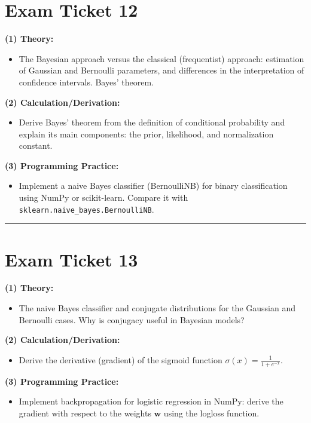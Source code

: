 \documentclass[a4paper,12pt]{article}
\begin{document}
\section*{Exam Ticket 12}
\textbf{(1) Theory:}
\begin{itemize}
  \item The Bayesian approach versus the classical (frequentist) approach: estimation of Gaussian and Bernoulli parameters, and differences in the interpretation of confidence intervals. Bayes' theorem.
\end{itemize}

\textbf{(2) Calculation/Derivation:}
\begin{itemize}
  \item Derive Bayes' theorem from the definition of conditional probability and explain its main components: the prior, likelihood, and normalization constant.
\end{itemize}

\textbf{(3) Programming Practice:}
\begin{itemize}
  \item Implement a naive Bayes classifier (BernoulliNB) for binary classification using NumPy or scikit-learn. Compare it with \texttt{sklearn.naive\_bayes.BernoulliNB}.
\end{itemize}

\noindent\rule{\textwidth}{0.4pt}
\newpage

\section*{Exam Ticket 13}
\textbf{(1) Theory:}
\begin{itemize}
  \item The naive Bayes classifier and conjugate distributions for the Gaussian and Bernoulli cases. Why is conjugacy useful in Bayesian models?
\end{itemize}

\textbf{(2) Calculation/Derivation:}
\begin{itemize}
  \item Derive the derivative (gradient) of the sigmoid function $\sigma(x) = \frac{1}{1 + e^{-x}}$.
\end{itemize}

\textbf{(3) Programming Practice:}
\begin{itemize}
  \item Implement backpropagation for logistic regression in NumPy: derive the gradient with respect to the weights $\mathbf{w}$ using the logloss function.
\end{itemize}
\end{document}
